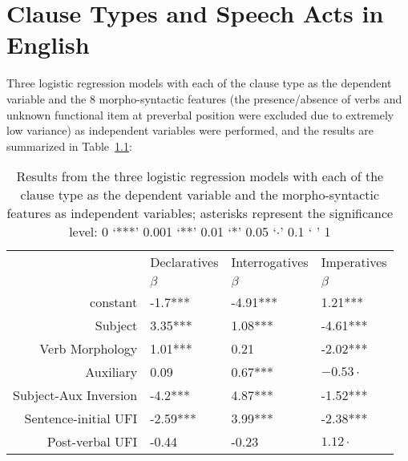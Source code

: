 
\chapter{Clause Types and Speech Acts in English}%
\label{appx:engcl}

Three logistic regression models with each of the clause type as the dependent variable and the 8 morpho-syntactic features (the presence/absence of verbs and unknown functional item at preverbal position were excluded due to extremely low variance) as independent variables were performed, and the results are summarized in Table~\ref{tab:engcl:real-synstats}:


\begin{table}[H]
\begin{center}
\begin{tabular}{r|l|l|l}
\hline
 & Declaratives   & Interrogatives   & Imperatives \\
 & $\beta$  & $\beta$  & $\beta$ \\
 \hline\hline
constant & -1.7*** & -4.91*** & 1.21*** \\
\hline
Subject & 3.35*** & 1.08*** & -4.61*** \\
\hline
Verb Morphology & 1.01*** & 0.21  & -2.02*** \\
\hline
Auxiliary & 0.09  & 0.67*** & $-0.53{\cdot}$ \\
\hline
Subject-Aux Inversion & -4.2*** & 4.87*** & -1.52*** \\
\hline
Sentence-initial UFI & -2.59*** & 3.99*** & -2.38*** \\
\hline
Post-verbal UFI & -0.44  & -0.23  & $1.12{\cdot}$ \\
\hline \hline
\end{tabular}
\end{center}
\caption{Results from the three logistic regression models with each of the clause type as the dependent variable and the morpho-syntactic features as independent variables; asterisks represent the significance level: 0 ‘***’ 0.001 ‘**’ 0.01 ‘*’ 0.05 ‘$\cdot$’ 0.1 ‘ ’ 1}
\label{tab:engcl:real-synstats}
\end{table}%



